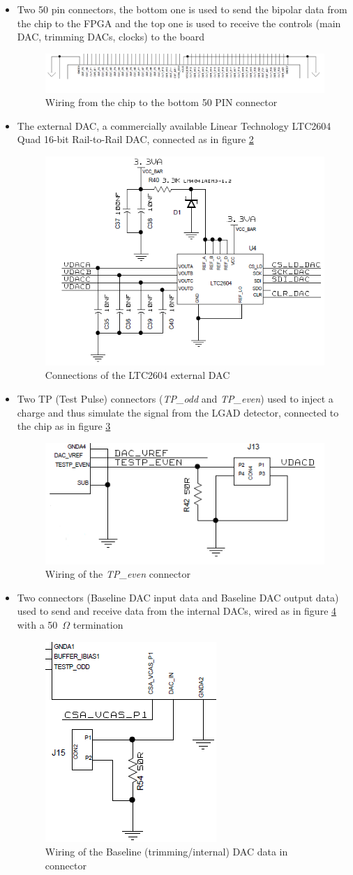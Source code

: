 \begin{itemize}
	\item Two 50 pin connectors, the bottom one is used to send the bipolar data from the chip to the FPGA and the top one is used to receive the controls (main DAC, trimming DACs, clocks) to the board
	\begin{figure}[H]
		\centering
		\includegraphics[width=0.95\linewidth]{IMG/ch5/DATATOFPGA}
		\caption{Wiring from the chip to the bottom 50 PIN connector}
		\label{fig:datatofpga}
	\end{figure}
	\item The external DAC, a commercially available Linear Technology LTC2604 \cite{LTC2604} Quad 16-bit Rail-to-Rail DAC, connected as in figure \ref{fig:externaldac}
	\begin{figure}[H]
		\centering
		\includegraphics[width=0.3\linewidth]{IMG/ch5/EXTERNALDAC}
		\caption{Connections of the LTC2604 external DAC}
		\label{fig:externaldac}
	\end{figure}
	\item Two TP (Test Pulse) connectors (\textit{TP\_odd} and \textit{TP\_even}) used to inject a charge and thus simulate the signal from the LGAD detector, connected to the chip as in figure \ref{fig:tpconnector}
	\begin{figure}[H]
		\centering
		\includegraphics[width=0.4\linewidth]{IMG/ch5/TPCONNECTOR}
		\caption{Wiring of the \textit{TP\_even} connector}
		\label{fig:tpconnector}
	\end{figure}
	\item Two connectors (Baseline DAC input data and Baseline DAC output data) used to send and receive data from the internal DACs, wired as in figure \ref{fig:internaldacwiring} with a 50~$\Omega$ termination 
	\begin{figure}[H]
		\centering
		\includegraphics[width=0.2\linewidth]{IMG/ch5/INTERNALDACWIRING}
		\caption{Wiring of the Baseline (trimming/internal) DAC data in connector}
		\label{fig:internaldacwiring}
	\end{figure} 
\end{itemize} 
